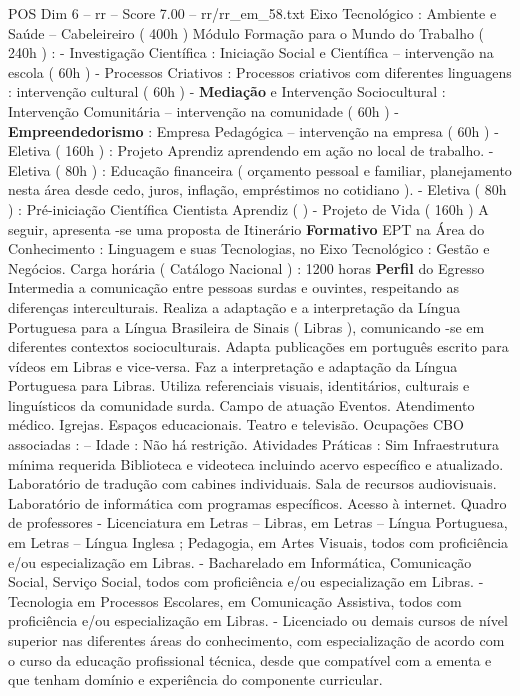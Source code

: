 \begin{textsample}{POS Dim 6 – rr – Score 7.00 – rr/rr\_em\_58.txt}
Eixo Tecnológico : Ambiente e Saúde – Cabeleireiro ( 400h ) Módulo Formação para o Mundo do Trabalho ( 240h ) : - Investigação Científica : Iniciação Social e Científica – intervenção na escola ( 60h ) - Processos Criativos : Processos criativos com diferentes linguagens : intervenção cultural ( 60h ) - \textbf{Mediação} e Intervenção Sociocultural : Intervenção Comunitária – intervenção na comunidade ( 60h ) - \textbf{Empreendedorismo} : Empresa Pedagógica – intervenção na empresa ( 60h ) - Eletiva ( 160h ) : Projeto Aprendiz aprendendo em ação no local de trabalho. - Eletiva ( 80h ) : Educação financeira ( orçamento pessoal e familiar, planejamento nesta área desde cedo, juros, inflação, empréstimos no cotidiano ). - Eletiva ( 80h ) : Pré-iniciação Científica Cientista Aprendiz ( ) - Projeto de Vida ( 160h ) A seguir, apresenta -se uma proposta de Itinerário \textbf{Formativo} EPT na Área do Conhecimento : Linguagem e suas Tecnologias, no Eixo Tecnológico : Gestão e Negócios.
Carga horária ( Catálogo Nacional ) : 1200 horas \textbf{Perfil} do Egresso Intermedia a comunicação entre pessoas surdas e ouvintes, respeitando as diferenças interculturais.
Realiza a adaptação e a interpretação da Língua Portuguesa para a Língua Brasileira de Sinais ( Libras ), comunicando -se em diferentes contextos socioculturais.
Adapta publicações em português escrito para vídeos em Libras e vice-versa.
Faz a interpretação e adaptação da Língua Portuguesa para Libras.
Utiliza referenciais visuais, identitários, culturais e linguísticos da comunidade surda.
Campo de atuação Eventos.
Atendimento médico.
Igrejas.
Espaços educacionais.
Teatro e televisão.
Ocupações CBO associadas : – Idade : Não há restrição.
Atividades Práticas : Sim Infraestrutura mínima requerida Biblioteca e videoteca incluindo acervo específico e atualizado.
Laboratório de tradução com cabines individuais.
Sala de recursos audiovisuais.
Laboratório de informática com programas específicos.
Acesso à internet.
Quadro de professores - Licenciatura em Letras – Libras, em Letras – Língua Portuguesa, em Letras – Língua Inglesa ; Pedagogia, em Artes Visuais, todos com proficiência e/ou especialização em Libras. - Bacharelado em Informática, Comunicação Social, Serviço Social, todos com proficiência e/ou especialização em Libras. - Tecnologia em Processos Escolares, em Comunicação Assistiva, todos com proficiência e/ou especialização em Libras. - Licenciado ou demais cursos de nível superior nas diferentes áreas do conhecimento, com especialização de acordo com o curso da educação profissional técnica, desde que compatível com a ementa e que tenham domínio e experiência do componente curricular.

\end{textsample}
